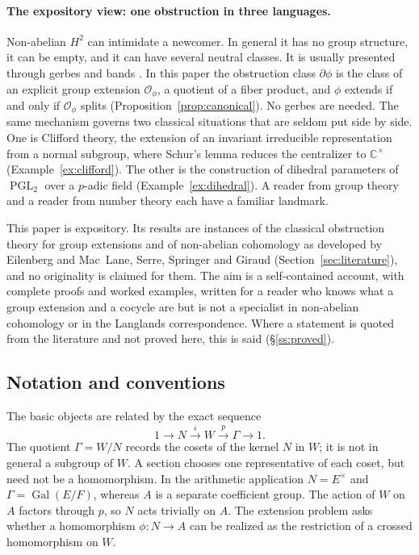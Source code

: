 \documentclass[12pt,letterpaper]{article}
\numberwithin{equation}{section}
\theoremstyle{plain}
\theoremstyle{definition}
\newcommand{\C}{\mathbb{C}}
\DeclareMathOperator{\Gal}{Gal}
\DeclareMathOperator{\PGL}{PGL}
\begin{document}
\paragraph{The expository view: one obstruction in three languages.}
Non-abelian $H^2$ can intimidate a newcomer. In general it has no group
structure, it can be empty, and it can have several neutral classes. It
is usually presented through gerbes and bands \cite{Gi71}. In this paper
the obstruction class $\partial\phi$ is the class of an explicit group
extension $\mathcal{O}_\phi$, a quotient of a fiber product, and $\phi$
extends if and only if $\mathcal{O}_\phi$ splits
(Proposition~\ref{prop:canonical}). No gerbes are needed. The same
mechanism governs two classical situations that are seldom put side by
side. One is Clifford theory, the extension of an invariant irreducible
representation from a normal subgroup, where Schur's lemma reduces the
centralizer to $\C^\times$ (Example~\ref{ex:clifford}). The other is the
construction of dihedral parameters of $\PGL_2$ over a $p$-adic field
(Example~\ref{ex:dihedral}). A reader from group theory and a reader
from number theory each have a familiar landmark.

This paper is expository. Its results are instances of the classical
obstruction theory for group extensions and of non-abelian cohomology as
developed by Eilenberg and Mac~Lane, Serre, Springer and Giraud
(Section~\ref{sec:literature}), and no originality is claimed for them.
The aim is a self-contained account, with complete proofs and worked
examples, written for a reader who knows what a group extension and a
cocycle are but is not a specialist in non-abelian cohomology or in the
Langlands correspondence. Where a statement is quoted from the literature
and not proved here, this is said (\S\ref{ss:proved}).

\subsection{Notation and conventions}\label{ss:notation}

The basic objects are related by the exact sequence
\[
1\longrightarrow N\overset{i}{\longrightarrow}W
\overset{p}{\longrightarrow}\Gamma\longrightarrow1.
\]
The quotient $\Gamma=W/N$ records the cosets of the kernel $N$ in $W$; it is not in general a subgroup of $W$. A section chooses one representative of each coset, but need not be a homomorphism. In the arithmetic application $N=E^\times$ and $\Gamma=\Gal(E/F)$, whereas $A$ is a separate coefficient group. The action of $W$ on $A$ factors through $p$, so $N$ acts trivially on $A$. The extension problem asks whether a homomorphism $\phi:N\to A$ can be realized as the restriction of a crossed homomorphism on $W$.
\end{document}
